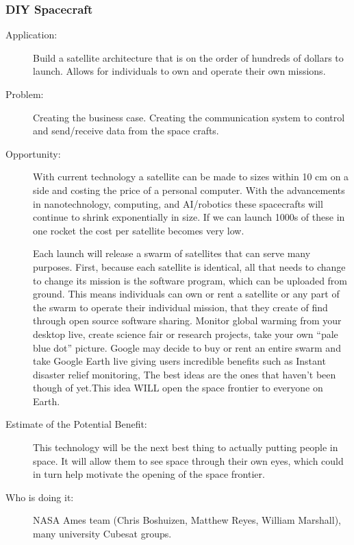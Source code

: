 \documentclass[letter,11pt]{article}
\begin{document}
\subsubsection{DIY Spacecraft}

\begin{description}
\item[Application:] Build a satellite architecture that is on the order of hundreds of dollars to launch. Allows for individuals to own and operate their own missions.

\item[Problem:] Creating the business case. Creating the communication system to control and send/receive data from the space crafts.

\item[Opportunity:] With current technology a satellite can be made to sizes within 10 cm on a side and costing the price of a personal computer. With the advancements in nanotechnology, computing, and AI/robotics these spacecrafts will continue to shrink exponentially in size. If we can launch 1000s of these in one rocket the cost per satellite becomes very low. 

Each launch will release a swarm of satellites that can serve many purposes. First, because each satellite is identical, all that needs to change to change its mission is the software program, which can be uploaded from ground. This means individuals can own or rent a satellite or any part of the swarm to operate their individual mission, that they create of find through open source software sharing. Monitor global warming from your desktop live, create science fair or research projects, take your own ``pale blue dot'' picture. Google may decide to buy or rent an entire swarm and take Google Earth live giving users incredible benefits such as Instant disaster relief monitoring, The best ideas are the ones that haven't been though of yet.This idea WILL open the space frontier to everyone on Earth.

\item[Estimate of the Potential Benefit:] This technology will be the next best thing to actually putting people in space. It will allow them to see space through their own eyes, which could in turn help motivate the opening of the space frontier.

\item[Who is doing it:] NASA Ames team (Chris Boshuizen, Matthew Reyes, William Marshall), many university Cubesat groups.
\end{description}
\end{document}
